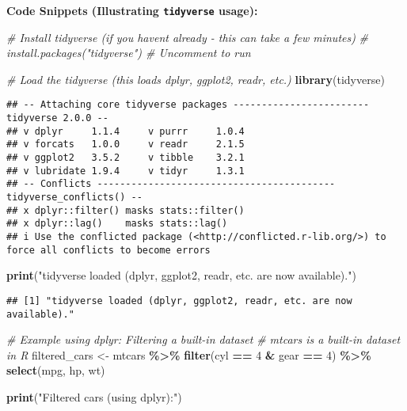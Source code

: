\documentclass[
]{article}
\newenvironment{Shaded}{\begin{snugshade}}{\end{snugshade}}
\newcommand{\CommentTok}[1]{\textcolor[rgb]{0.56,0.35,0.01}{\textit{#1}}}
\newcommand{\DecValTok}[1]{\textcolor[rgb]{0.00,0.00,0.81}{#1}}
\newcommand{\FunctionTok}[1]{\textcolor[rgb]{0.13,0.29,0.53}{\textbf{#1}}}
\newcommand{\NormalTok}[1]{#1}
\newcommand{\OtherTok}[1]{\textcolor[rgb]{0.56,0.35,0.01}{#1}}
\newcommand{\SpecialCharTok}[1]{\textcolor[rgb]{0.81,0.36,0.00}{\textbf{#1}}}
\newcommand{\StringTok}[1]{\textcolor[rgb]{0.31,0.60,0.02}{#1}}
\begin{document}
\textbf{Code Snippets (Illustrating \texttt{tidyverse} usage):}

\begin{Shaded}
\begin{Highlighting}[]
\CommentTok{\# Install tidyverse (if you haven\textquotesingle{}t already {-} this can take a few minutes)}
\CommentTok{\# install.packages("tidyverse") \# Uncomment to run}

\CommentTok{\# Load the tidyverse (this loads dplyr, ggplot2, readr, etc.)}
\FunctionTok{library}\NormalTok{(tidyverse)}
\end{Highlighting}
\end{Shaded}

\begin{verbatim}
## -- Attaching core tidyverse packages ------------------------ tidyverse 2.0.0 --
## v dplyr     1.1.4     v purrr     1.0.4
## v forcats   1.0.0     v readr     2.1.5
## v ggplot2   3.5.2     v tibble    3.2.1
## v lubridate 1.9.4     v tidyr     1.3.1
## -- Conflicts ------------------------------------------ tidyverse_conflicts() --
## x dplyr::filter() masks stats::filter()
## x dplyr::lag()    masks stats::lag()
## i Use the conflicted package (<http://conflicted.r-lib.org/>) to force all conflicts to become errors
\end{verbatim}

\begin{Shaded}
\begin{Highlighting}[]
\FunctionTok{print}\NormalTok{(}\StringTok{"tidyverse loaded (dplyr, ggplot2, readr, etc. are now available)."}\NormalTok{)}
\end{Highlighting}
\end{Shaded}

\begin{verbatim}
## [1] "tidyverse loaded (dplyr, ggplot2, readr, etc. are now available)."
\end{verbatim}

\begin{Shaded}
\begin{Highlighting}[]
\CommentTok{\# Example using dplyr: Filtering a built{-}in dataset}
\CommentTok{\# mtcars is a built{-}in dataset in R}
\NormalTok{filtered\_cars }\OtherTok{\textless{}{-}}\NormalTok{ mtcars }\SpecialCharTok{\%\textgreater{}\%}
  \FunctionTok{filter}\NormalTok{(cyl }\SpecialCharTok{==} \DecValTok{4} \SpecialCharTok{\&}\NormalTok{ gear }\SpecialCharTok{==} \DecValTok{4}\NormalTok{) }\SpecialCharTok{\%\textgreater{}\%}
  \FunctionTok{select}\NormalTok{(mpg, hp, wt)}

\FunctionTok{print}\NormalTok{(}\StringTok{"Filtered cars (using dplyr):"}\NormalTok{)}
\end{Highlighting}
\end{Shaded}
\end{document}
